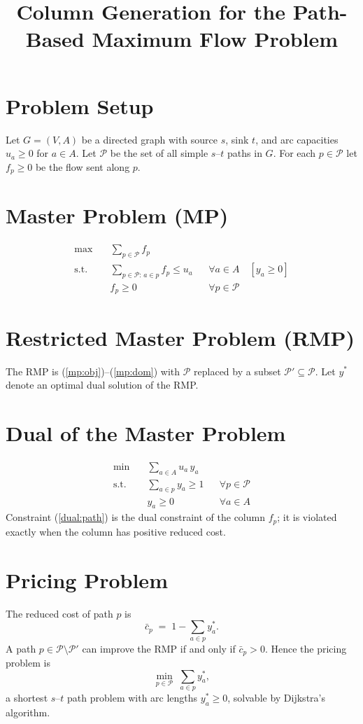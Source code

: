 \documentclass[11pt]{article}
\title{Column Generation for the Path-Based Maximum Flow Problem}
\author{}
\date{}
\begin{document}
\maketitle

\section{Problem Setup}
Let $G=(V,A)$ be a directed graph with source $s$, sink $t$, and arc capacities $u_a\ge 0$ for $a\in A$. Let $\mathcal{P}$ be the set of all simple $s$--$t$ paths in $G$. For each $p\in\mathcal{P}$ let $f_p\ge 0$ be the flow sent along $p$.

\section{Master Problem (MP)}
\begin{align}
\max\quad & \sum_{p\in\mathcal{P}} f_p \label{mp:obj}\\
\text{s.t.}\quad & \sum_{p\in\mathcal{P}:\, a\in p} f_p \le u_a && \forall a\in A \quad [y_a\ge 0] \label{mp:cap}\\
& f_p \ge 0 && \forall p\in\mathcal{P} \label{mp:dom}
\end{align}

\section{Restricted Master Problem (RMP)}
The RMP is (\ref{mp:obj})--(\ref{mp:dom}) with $\mathcal{P}$ replaced by a subset $\mathcal{P}'\subseteq\mathcal{P}$. Let $y^*$ denote an optimal dual solution of the RMP.

\section{Dual of the Master Problem}
\begin{align}
\min\quad & \sum_{a\in A} u_a\, y_a \\
\text{s.t.}\quad & \sum_{a\in p} y_a \ge 1 && \forall p\in\mathcal{P} \label{dual:path}\\
& y_a \ge 0 && \forall a\in A
\end{align}
Constraint (\ref{dual:path}) is the dual constraint of the column $f_p$; it is violated exactly when the column has positive reduced cost.

\section{Pricing Problem}
The reduced cost of path $p$ is
\begin{equation}
\bar c_p \;=\; 1-\sum_{a\in p} y^*_a .
\end{equation}
A path $p\in\mathcal{P}\setminus\mathcal{P}'$ can improve the RMP if and only if $\bar c_p>0$. Hence the pricing problem is
\begin{equation}
\min_{p\in\mathcal{P}} \; \sum_{a\in p} y^*_a ,
\end{equation}
a shortest $s$--$t$ path problem with arc lengths $y^*_a\ge 0$, solvable by Dijkstra's algorithm.
\end{document}
